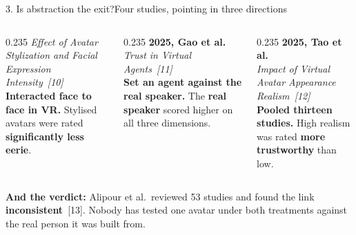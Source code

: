 \documentclass[aspectratio=169,10pt]{beamer}
\newcommand{\hl}[1]{{\color{knblue}\textbf{#1}}}
\newcommand{\bad}[1]{{\color{knred}\textbf{#1}}}
\begin{document}
\begin{frame}{3. Is abstraction the exit?}{Four studies, pointing in three directions}
\begin{columns}[T]
\begin{column}{0.235\textwidth}
      {\tiny\color{knblue}\itshape Effect of Avatar Stylization and Facial Expression Intensity~[10]}\\[0.3em]
      {\scriptsize \hl{Interacted face to face in VR.} Stylised avatars were rated \hl{significantly less eerie}.}
    \end{column}
    \begin{column}{0.235\textwidth}\centering
      {\scriptsize\bfseries 2025, Gao et al.}\\[0.25em]
      {\tiny\color{knblue}\itshape Trust in Virtual Agents~[11]}\\[0.3em]
      {\scriptsize \hl{Set an agent against the real speaker.} The \bad{real speaker} scored higher on all three dimensions.}
    \end{column}
    \begin{column}{0.235\textwidth}\centering
      {\scriptsize\bfseries 2025, Tao et al.}\\[0.25em]
      {\tiny\color{knblue}\itshape Impact of Virtual Avatar Appearance Realism~[12]}\\[0.3em]
      {\scriptsize \hl{Pooled thirteen studies.} High realism was rated \bad{more trustworthy} than low.}
    \end{column}
  \end{columns}
  \vfill
  \noindent\colorbox{knlight}{\parbox{0.975\textwidth}{\scriptsize\color{knblue}
  \textbf{And the verdict:} Alipour et al.\ reviewed 53 studies and found the link \textbf{inconsistent}~[13].
  Nobody has tested one avatar under both treatments against the real person it was built from.}}
\end{frame}
\end{document}
